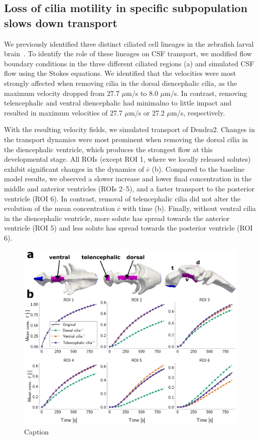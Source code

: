 \documentclass[fleqn]{wlscirep}
\newcommand{\cbar}{\overline{c}}
\begin{document}
\subsection*{Loss of cilia motility in specific subpopulation slows down transport}
We previously identified three distinct ciliated cell lineages in the
zebrafish larval brain~\cite{Olstad2019CiliaryDevelopment, DGama2025MotileBrain}.
To identify the role of these lineages on CSF transport, we modified flow boundary conditions
in the three different ciliated regions (a) and simulated
CSF flow using the Stokes equations. We identified that the velocities were most strongly
affected when removing cilia in the dorsal diencephalic cilia,
as the maximum velocity dropped from 27.7 $\mu$m/s to 8.0 $\mu$m/s.
In contrast, removing telencephalic and ventral diencephalic had minimalno to little impact and resulted in maximum velocities of 27.7 $\mu$m/s or 27.2 $\mu$m/s, respectively.

With the resulting velocity fields, we simulated transport of Dendra2.
Changes in the transport dynamics were most prominent when removing the dorsal cilia
in the diencephalic ventricle, which produces the strongest flow at this developmental stage.
All ROIs (except ROI 1, where we locally released solutes) exhibit significant changes
in the dynamics of $\cbar$ (b).
Compared to the baseline model results, we observed a slower increase and lower final concentration
in the middle and anterior ventricles (ROIs 2--5),
and a faster transport to the posterior ventricle (ROI 6).
In contrast, removal of telencephalic cilia did not alter the evolution of the
mean concentration $\cbar$ with time (b).
Finally, without ventral cilia in the diencephalic ventricle,
more solute has spread towards the anterior ventricle (ROI 5) and
less solute has spread towards the posterior ventricle (ROI 6).

\begin{figure}[H]
    \centering
    \includegraphics[width=\textwidth]{graphics/figure5_compare_cilia_modifications.png}
    \caption{Caption}
    \label{fig:figure5_compare_cilia_modifications}
\end{figure}
\end{document}
